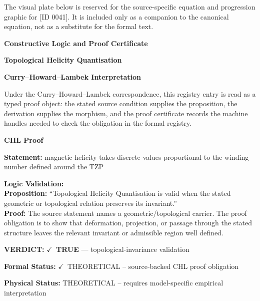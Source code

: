 \begingroup\footnotesize\sloppy
The visual plate below is reserved for the source-specific equation and progression graphic for [ID 0041]. It is included only as a companion to the canonical equation, not as a substitute for the formal text.
\par\endgroup
\ifTZPDarkEdition
{}
\fi

\clearpage
\begingroup\tzpsupportsetup
\noindent\textbf{\fontsize{10.8pt}{12.8pt}\selectfont [ID 0041] Constructive Logic and Proof Certificate}\par
\noindent\textbf{\fontsize{10pt}{12pt}\selectfont Topological Helicity Quantisation}\par
\vspace{0.45em}
\begingroup
\footnotesize
\setlength{\parskip}{0.22em}
\setlength{\parindent}{0pt}
\noindent\textbf{Curry--Howard--Lambek Interpretation}\par
Under the Curry--Howard--Lambek correspondence, this registry entry is read as a typed proof
object: the stated source condition supplies the proposition, the derivation supplies the
morphism, and the proof certificate records the machine handles needed to check the obligation
in the formal registry.

\vspace{0.45em}
\noindent\textbf{CHL Proof}\par
\textbf{Statement:} magnetic helicity takes discrete values proportional to the winding number defined
around the TZP

\textbf{Logic Validation:}\\
\textbf{Proposition:} ``Topological Helicity Quantisation is valid when the stated geometric or topological
relation preserves its invariant.''\\
\textbf{Proof:} The source statement names a geometric/topological carrier. The proof obligation is to
show that deformation, projection, or passage through the stated structure leaves the
relevant invariant or admissible region well defined.

\textbf{VERDICT:} \ensuremath{\checkmark}\ \textbf{TRUE} --- topological-invariance validation

\textbf{Formal Status:} \ensuremath{\checkmark}\ THEORETICAL -- source-backed CHL proof obligation

\textbf{Physical Status:} THEORETICAL -- requires model-specific empirical interpretation
\par\vspace{0.45em}
\par
\ifTZPDarkEdition
{}
\fi
\endgroup
\endgroup

